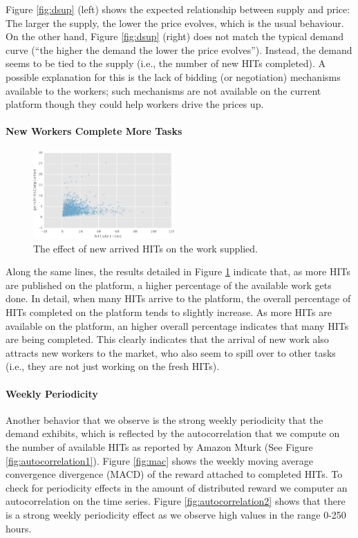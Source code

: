 Figure \ref{fig:dsup} (left) shows the expected relationship between supply and price: The larger the supply, the lower the price evolves, which is the usual behaviour. On the other hand, Figure \ref{fig:dsup} (right) does not match the typical demand curve (“the higher the demand the lower the price evolves”).
Instead, the demand seems to be tied to the supply (i.e., the number of new HITs completed). A possible explanation for this is the lack of bidding (or negotiation) mechanisms available to the workers; such mechanisms are not available on the current platform though they could help workers drive the prices up. 

\paragraph{New Workers Complete More Tasks}
\begin{figure}[tb]
	\centering
		\includegraphics[width=0.48\textwidth]{figures/percHitsCompleted}
	\caption{The effect of new arrived HITs on the work  supplied.}
	\label{fig:perc_hits_completed}
\end{figure}
Along the same lines, the results detailed in Figure \ref{fig:perc_hits_completed} indicate that, as more HITs are published on the platform, a higher percentage of the available work gets done. In detail, when many HITs arrive to the platform, the overall percentage of HITs completed on the platform tends to slightly increase. As more HITs are available on the platform, an higher overall percentage indicates that many HITs are being completed. This clearly indicates that the arrival of new work also attracts new workers to the market, who also seem to spill over to other tasks (i.e., they are not just working on the fresh HITs). 

\paragraph{Weekly Periodicity}
Another behavior that we observe is the strong weekly periodicity that the demand exhibits, which is reflected by the autocorrelation that we compute on the number of available HITs as reported by Amazon Mturk (See Figure \ref{fig:autocorrelation1}). 
Figure \ref{fig:mac} shows the weekly moving average convergence divergence (MACD) of the reward attached to completed HITs. To check for periodicity effects in the amount of distributed reward we computer an autocorrelation on the time series. Figure \ref{fig:autocorrelation2} shows that there is a strong weekly periodicity effect as we observe high values in the range 0-250 hours. 

